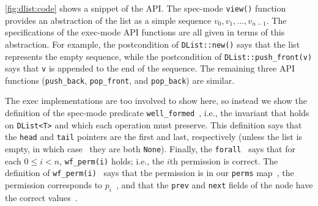 \autoref{fig:dlist:code} shows a snippet of the API. The spec-mode \verb`view()` function provides an abstraction
of the list as a simple sequence $v_0, v_1, \ldots, v_{n-1}$.
The specifications of the exec-mode API functions are all given in terms of this abstraction.
For example, the postcondition of \verb`DList::new()` says that the list represents the empty sequence,
while the postcondition of \verb`DList::push_front(v)` says that \verb`v` is appended to the end of the sequence.
The remaining three API functions (\verb`push_back`, \verb`pop_front`, and \verb`pop_back`) are similar.

The exec implementations are too involved to show here, so instead we show the definition of
the spec-mode predicate \verb`well_formed`~,
i.e., the invariant that holds on \verb`DList<T>` and which each operation must preserve.
This definition says that~ the \verb`head` and \verb`tail` pointers are the first and last, respectively
(unless the list is empty, in which case~ they are both \verb`None`).
Finally, the \verb`forall`~ says that for each $0 \le i < n$, \verb`wf_perm(i)` holds; i.e.,
the $i$th permission is correct.
The definition of \verb`wf_perm(i)`~ says that
the permission is in our \verb`perms` map~,
the permission corresponds to $p_i$~,
and that the \verb`prev` and \verb`next` fields of the node have the correct values~.


